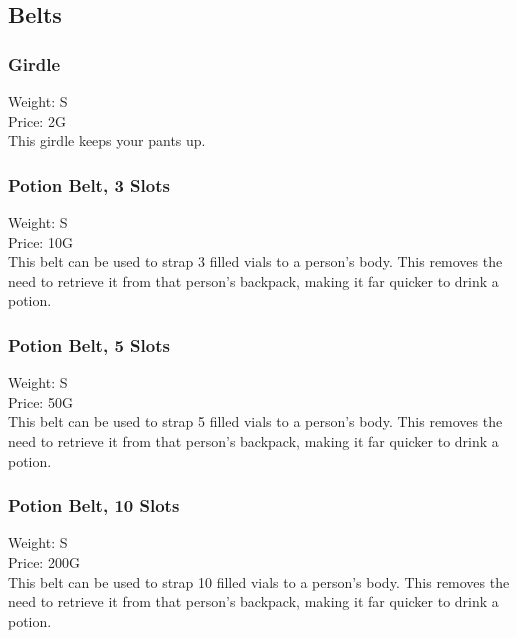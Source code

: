 \subsection{Belts}

\subsubsection{Girdle}
Weight: S\\
Price: 2G\\
This girdle keeps your pants up.

\subsubsection{Potion Belt, 3 Slots}
Weight: S\\
Price: 10G\\
This belt can be used to strap 3 filled vials to a person's body. This removes the need to retrieve it from that person's backpack, making it far quicker to drink a potion.

\subsubsection{Potion Belt, 5 Slots}
Weight: S\\
Price: 50G\\
This belt can be used to strap 5 filled vials to a person's body. This removes the need to retrieve it from that person's backpack, making it far quicker to drink a potion.

\subsubsection{Potion Belt, 10 Slots}
Weight: S\\
Price: 200G\\
This belt can be used to strap 10 filled vials to a person's body. This removes the need to retrieve it from that person's backpack, making it far quicker to drink a potion.



